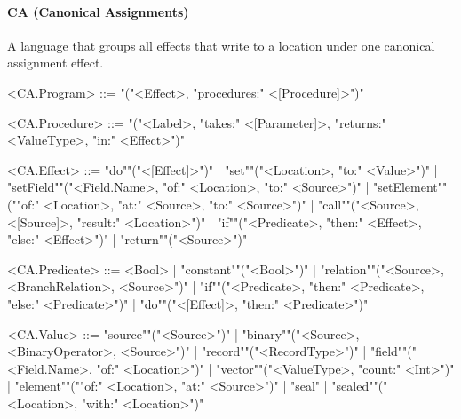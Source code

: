 \documentclass[main.tex]{subfiles}
\begin{document}
\paragraph{ CA (Canonical Assignments) } A language that groups all effects that write to a location under one canonical assignment effect.
\begin{grammar}
	\footnotesize
				<CA.Program> ::=
							"("<Effect>, "procedures:" <[Procedure]>")"
				\par
				<CA.Procedure> ::=
							"("<Label>, "takes:" <[Parameter]>, "returns:" <ValueType>, "in:" <Effect>")"
				\par
				<CA.Effect> ::=
						"do""("<[Effect]>")"
						| "set""("<Location>, "to:" <Value>")"
						| "setField""("<Field.Name>, "of:" <Location>, "to:" <Source>")"
						| "setElement""(""of:" <Location>, "at:" <Source>, "to:" <Source>")"
						| "call""("<Source>, <[Source]>, "result:" <Location>")"
						| "if""("<Predicate>, "then:" <Effect>, "else:" <Effect>")"
						| "return""("<Source>")"
				\par
				<CA.Predicate> ::=
						<Bool> |
						"constant""("<Bool>")"
						| "relation""("<Source>, <BranchRelation>, <Source>")"
						| "if""("<Predicate>, "then:" <Predicate>, "else:" <Predicate>")"
						| "do""("<[Effect]>, "then:" <Predicate>")"
				\par
				<CA.Value> ::=
						"source""("<Source>")"
						| "binary""("<Source>, <BinaryOperator>, <Source>")"
						| "record""("<RecordType>")"
						| "field""("<Field.Name>, "of:" <Location>")"
						| "vector""("<ValueType>, "count:" <Int>")"
						| "element""(""of:" <Location>, "at:" <Source>")"
						| "seal"
						| "sealed""("<Location>, "with:" <Location>")"
				\par
\end{grammar}
\par
\end{document}

